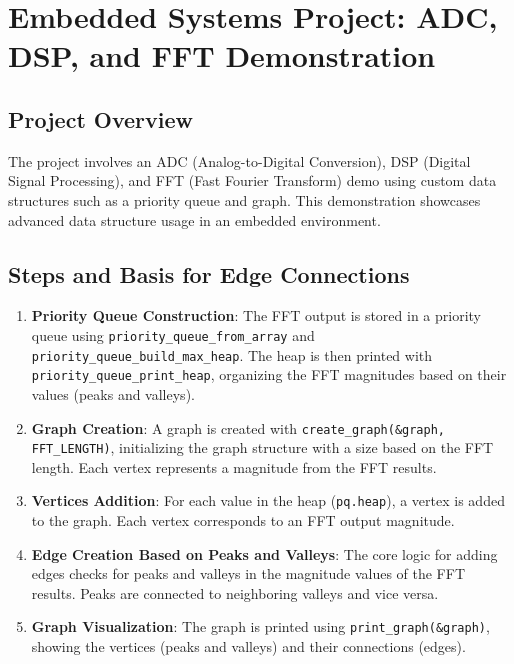 \documentclass{article}
\begin{document}
\section*{Embedded Systems Project: ADC, DSP, and FFT Demonstration}
\subsection*{Project Overview}
The project involves an ADC (Analog-to-Digital Conversion), DSP (Digital Signal Processing), and FFT (Fast Fourier Transform) demo using custom data structures such as a priority queue and graph. This demonstration showcases advanced data structure usage in an embedded environment.

\subsection*{Steps and Basis for Edge Connections}
\begin{enumerate}
    \item \textbf{Priority Queue Construction}: 
    The FFT output is stored in a priority queue using \texttt{priority\_queue\_from\_array} and \texttt{priority\_queue\_build\_max\_heap}. The heap is then printed with \texttt{priority\_queue\_print\_heap}, organizing the FFT magnitudes based on their values (peaks and valleys).
    
    \item \textbf{Graph Creation}:
    A graph is created with \texttt{create\_graph(\&graph, FFT\_LENGTH)}, initializing the graph structure with a size based on the FFT length. Each vertex represents a magnitude from the FFT results.
    
    \item \textbf{Vertices Addition}:
    For each value in the heap (\texttt{pq.heap}), a vertex is added to the graph. Each vertex corresponds to an FFT output magnitude.
    
    \item \textbf{Edge Creation Based on Peaks and Valleys}:
    The core logic for adding edges checks for peaks and valleys in the magnitude values of the FFT results. Peaks are connected to neighboring valleys and vice versa.
    
    \item \textbf{Graph Visualization}:
    The graph is printed using \texttt{print\_graph(\&graph)}, showing the vertices (peaks and valleys) and their connections (edges).
\end{enumerate}
\end{document}

